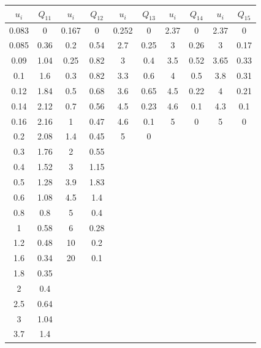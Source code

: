 \documentclass{report}
\begin{document}
\begin{tabular}{|c|c||c|c||c|c||c|c||c|c|}
\hline 
$u_i$ & $Q_{11}$ & $u_i$ & $Q_{12}$ & $u_i$ & $Q_{13}$ & $u_i$ & $Q_{14}$ & $u_i$ & $Q_{15}$ \\
\hline 
0.083 & 0    & 0.167 & 0    & 0.252 & 0    & 2.37 & 0    & 2.37 & 0    \\
0.085 & 0.36 & 0.2   & 0.54 & 2.7   & 0.25 & 3    & 0.26 & 3    & 0.17 \\
0.09  & 1.04 & 0.25  & 0.82 & 3     & 0.4  & 3.5  & 0.52 & 3.65 & 0.33 \\
0.1   & 1.6  & 0.3   & 0.82 & 3.3   & 0.6  & 4    & 0.5  & 3.8  & 0.31 \\
0.12  & 1.84 & 0.5   & 0.68 & 3.6   & 0.65 & 4.5  & 0.22 & 4    & 0.21 \\
0.14  & 2.12 & 0.7   & 0.56 & 4.5   & 0.23 & 4.6  & 0.1  & 4.3  & 0.1  \\
0.16  & 2.16 & 1     & 0.47 & 4.6   & 0.1  & 5    & 0    & 5    & 0    \\
0.2   & 2.08 & 1.4   & 0.45 & 5     & 0    &      &      &      &      \\
0.3   & 1.76 & 2     & 0.55 &       &      &      &      &      &      \\
0.4   & 1.52 & 3     & 1.15 &       &      &      &      &      &      \\
0.5   & 1.28 & 3.9   & 1.83 &       &      &      &      &      &      \\
0.6   & 1.08 & 4.5   & 1.4  &       &      &      &      &      &      \\
0.8   & 0.8  & 5     & 0.4  &       &      &      &      &      &      \\
1     & 0.58 & 6     & 0.28 &       &      &      &      &      &      \\
1.2   & 0.48 & 10    & 0.2  &       &      &      &      &      &      \\
1.6   & 0.34 & 20    & 0.1  &       &      &      &      &      &      \\
1.8   & 0.35 &       &      &       &      &      &      &      &      \\
2     & 0.4  &       &      &       &      &      &      &      &      \\ 
2.5   & 0.64 &       &      &       &      &      &      &      &      \\ 
3     & 1.04 &       &      &       &      &      &      &      &      \\ 
3.7   & 1.4  &       &      &       &      &      &      &      &      \\ 

\end{tabular}
\end{document}
